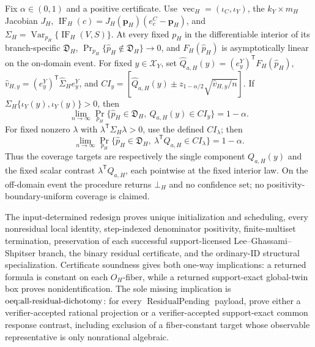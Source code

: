 Fix \(\alpha\in(0,1)\) and a positive certificate. Use \(\operatorname{vec}_H=(\iota_C,\iota_Y)\), the \(k_Y\times m_H\) Jacobian \(J_H\), \(\operatorname{IF}_H(c)=J_H(\mathbf p_H)(e_c^C-\mathbf p_H)\), and \(\Sigma_H=\operatorname{Var}_{p_H}\{\operatorname{IF}_H(V,S)\}\). At every fixed \(p_H\) in the differentiable interior of its branch-specific \(\mathfrak D_H\), \(\Pr_{p_H}\{\widehat p_H\notin\mathfrak D_H\}\to0\), and \(F_H(\widehat p_H)\) is asymptotically linear on the on-domain event. For fixed \(y\in\mathcal X_Y\), set \(\widehat Q_{a,H}(y)=(e_y^Y)^{\mathsf T}F_H(\widehat p_H)\), \(\widehat v_{H,y}=(e_y^Y)^{\mathsf T}\widehat\Sigma_H e_y^Y\), and \(CI_y=[\widehat Q_{a,H}(y)\pm z_{1-\alpha/2}\sqrt{\widehat v_{H,y}/n}]\). If \(\Sigma_H\{\iota_Y(y),\iota_Y(y)\}>0\), then
\[
\lim_{n\to\infty}\Pr_{p_H}\{\widehat p_H\in\mathfrak D_H,\ Q_{a,H}(y)\in CI_y\}=1-\alpha.
\]
For fixed nonzero \(\lambda\) with \(\lambda^{\mathsf T}\Sigma_H\lambda>0\), use the defined \(CI_{\lambda}\); then
\[
\lim_{n\to\infty}\Pr_{p_H}\{\widehat p_H\in\mathfrak D_H,\ \lambda^{\mathsf T}Q_{a,H}\in CI_{\lambda}\}=1-\alpha.
\]
Thus the coverage targets are respectively the single component \(Q_{a,H}(y)\) and the fixed scalar contrast \(\lambda^{\mathsf T}Q_{a,H}\), each pointwise at the fixed interior law. On the off-domain event the procedure returns \(\bot_H\) and no confidence set; no positivity-boundary-uniform coverage is claimed.

The input-determined redesign proves unique initialization and scheduling, every nonresidual local identity, step-indexed denominator positivity, finite-multiset termination, preservation of each successful support-licensed Lee--Ghassami--Shpitser branch, the binary residual certificate, and the ordinary-ID structural specialization.  Certificate soundness gives both one-way implications: a returned formula is constant on each \(O_H\)-fiber, while a returned support-exact global-twin box proves nonidentification.  The sole missing implication is \(\textnormal{oeq:all-residual-dichotomy}\): for every \(\operatorname{ResidualPending}\) payload, prove either a verifier-accepted rational projection or a verifier-accepted support-exact common response contrast, including exclusion of a fiber-constant target whose observable representative is only nonrational algebraic.
